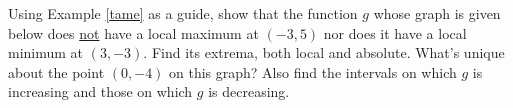 {Using Example \ref{tame} as a guide, show that the function $g$ whose graph is given below does \underline{not} have a local maximum at $(-3, 5)$ nor does it have a local minimum at $(3, -3)$.  Find its extrema, both local and absolute.  What's unique about the point $(0, -4)$ on this graph?  Also find the intervals on which $g$ is increasing and those on which $g$ is decreasing.

\begin{center}
\end{center} }
{}